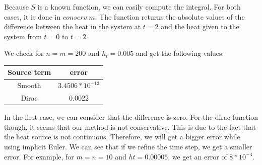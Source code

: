 Because $S$ is a known function, we can easily compute the integral. For both cases, it is done in $conserv.m$. The function returns the absolute values of the difference between the heat in the system at $t=2$ and the heat given to the system from $t=0$ to $t=2$.

We check for $n=m=200$ and $h_t = 0.005$ and get the following values:
\begin{center}
\begin{tabular}{|c|c|}
\hline 
Source term & error \\ 
\hline 
Smooth & $3.4506*10^{-13}$ \\ 
\hline 
Dirac & 0.0022 \\ 
\hline 
\end{tabular} 
\end{center}

In the first case, we can consider that the difference is zero. For the dirac function though, it seems that our method is not conservative. This is due to the fact that the heat source is not continuous. Therefore, we will get a bigger error while using implicit Euler. We can see that if we refine the time step, we get a smaller error. For example, for $m=n=10$ and $ht=0.00005$, we get an error of $8*10^{-4}$.
